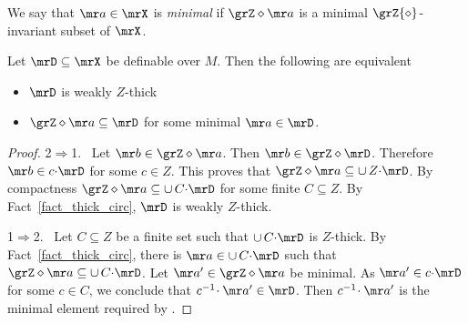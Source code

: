 We say that ${\mr a}\in\mrX$ is \emph{minimal\/} if $\grZ\diamond {\mr a}$ is a minimal $\grZ{\diamond}$-invariant subset of $\mrX$.

\begin{theorem}
  Let $\mrD\subseteq\mrX$ be definable over $M$.
  Then the following are equivalent
  \begin{itemize}
    \item [1.] $\mrD$ is weakly $Z$-thick
    \item [2.] $\grZ\diamond {\mr a}\subseteq\mrD$ for some minimal ${\mr a}\in\mrD$.
  \end{itemize}
\end{theorem}

\begin{proof}
  2$\Rightarrow$1. \ 
  Let ${\mr b}\in\grZ\diamond {\mr a}$.
  Then ${\mr b}\in\grZ\diamond\mrD$.
  Therefore ${\mr b}\in c{\cdot}\mrD$ for some $c\in Z$.
  This proves that $\grZ\diamond {\mr a}\subseteq\cup\,Z{\cdot}\mrD$.
  By compactness $\grZ\diamond {\mr a}\subseteq\cup\,C{\cdot}\mrD$ for some finite $C\subseteq Z$.
  By Fact~\ref{fact_thick_circ}, $\mrD$ is weakly $Z$-thick.

  1$\Rightarrow$2. \ 
  Let $C\subseteq Z$ be a finite set such that $\cup\,C{\cdot}\mrD$ is $Z$-thick.
  By Fact~\ref{fact_thick_circ}, there is ${\mr a}\in\cup\,C{\cdot}\mrD$ such that $\grZ\diamond {\mr a}\subseteq\cup\,C{\cdot}\mrD$.
  Let ${\mr a'}\in\grZ\diamond {\mr a}$ be minimal.
  As ${\mr a'}\in c{\cdot}\mrD$ for some $c\in C$, we conclude that $c^{-1}\!\cdot {\mr a'}\in\mrD$.
  Then $c^{-1}\!\cdot {\mr a'}$ is the minimal element required by .
\end{proof}

